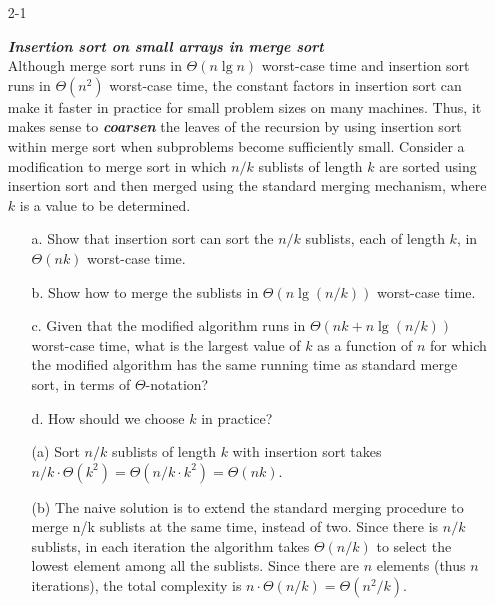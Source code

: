 \documentclass{report}
\makeatletter
\renewenvironment{framed}{%
 \def\FrameCommand##1{\hskip\@totalleftmargin
 \fboxsep=\FrameSep\fbox{##1}}%
 \MakeFramed {\advance\hsize-\width
   \@totalleftmargin\z@ \linewidth\hsize
   \@setminipage}}%
 {\par\unskip\endMakeFramed}
\makeatother
\begin{document}
\begin{enumerate}

\item[2{-}1]{\textbf{\emph{Insertion sort on small arrays in merge sort}}\\
Although merge sort runs in $\Theta(n \lg n)$ worst-case time and insertion sort
runs in $\Theta(n^2)$ worst-case time, the constant factors in insertion sort can make
it faster in practice for small problem sizes on many machines. Thus, it makes
sense to \textbf{\emph{coarsen}} the leaves of the recursion by using insertion
sort within merge sort when subproblems become sufficiently small. Consider
a modification to merge sort in which $n/k$ sublists of length $k$ are sorted
using insertion sort and then merged using the standard merging mechanism, where
$k$ is a value to be determined.

\begin{enumerate}
\item[a.] Show that insertion sort can sort the $n/k$ sublists, each of length
  $k$, in $\Theta(n k)$ worst-case time.
\item[b.] Show how to merge the sublists in $\Theta(n \lg(n/k))$ worst-case time.
\item[c.] Given that the modified algorithm runs in $\Theta(n k + n \lg(n/k))$
  worst-case time, what is the largest value of $k$ as a function of $n$ for
  which the modified algorithm has the same running time as standard merge sort,
  in terms of $\Theta$-notation?
\item[d.] How should we choose $k$ in practice?
\end{enumerate}
}

\begin{framed}

\begin{enumerate}
\item[(a)] Sort $n/k$ sublists of length $k$ with insertion sort takes
$n/k \cdot \Theta(k^2) = \Theta(n/k \cdot k^2) = \Theta(nk)$.

\item[(b)] The naive solution is to extend the standard merging procedure to
merge n/k sublists at the same time, instead of two. Since there is $n/k$
sublists, in each iteration the algorithm takes $\Theta(n/k)$ to select the
lowest element among all the sublists. Since there are $n$ elements (thus $n$
iterations), the total complexity is $n \cdot \Theta(n/k) = \Theta({n^2}/k)$.


\end{enumerate}
\end{framed}
\end{enumerate}
\end{document}
